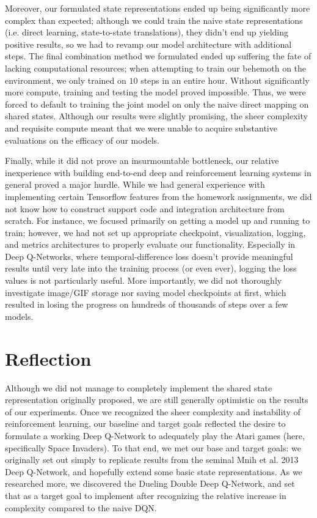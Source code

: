 \documentclass{article} %
\begin{document}
Moreover, our formulated state representations ended up being significantly more complex than
expected; although we could train the naive state representations (i.e. direct learning,
state-to-state translations), they didn't end up yielding positive results, so we had to revamp our
model architecture with additional steps. The final combination method we formulated ended up
suffering the fate of lacking computational resources; when attempting to train our behemoth on the
environment, we only trained on $10$ steps in an entire hour. Without significantly more compute,
training and testing the model proved impossible. Thus, we were forced to default to training the
joint model on only the naive direct mapping on shared states. Although our results were slightly
promising, the sheer complexity and requisite compute meant that we were unable to acquire
substantive evaluations on the efficacy of our models.

Finally, while it did not prove an insurmountable bottleneck, our relative inexperience with
building end-to-end deep and reinforcement learning systems in general proved a major hurdle. While
we had general experience with implementing certain Tensorflow features from the homework
assignments, we did not know how to construct support code and integration architecture from
scratch. For instance, we focused primarily on getting a model up and running to train; however, we
had not set up appropriate checkpoint, visualization, logging, and metrics architectures to properly
evaluate our functionality. Especially in Deep Q-Networks, where temporal-difference loss doesn't
provide meaningful results until very late into the training process (or even ever), logging the
loss values is not particularly useful. More importantly, we did not thoroughly investigate
image/GIF storage nor saving model checkpoints at first, which resulted in losing the progress on
hundreds of thousands of steps over a few models.


\section{Reflection}

Although we did not manage to completely implement the shared state representation originally
proposed, we are still generally optimistic on the results of our experiments. Once we recognized
the sheer complexity and instability of reinforcement learning, our baseline and target goals
reflected the desire to formulate a working Deep Q-Network to adequately play the Atari games (here,
specifically Space Invaders). To that end, we met our base and target goals: we originally set out
simply to replicate results from the seminal Mnih et al. 2013 Deep Q-Network, and hopefully extend
some basic state representations. As we researched more, we discovered the Dueling Double Deep
Q-Network, and set that as a target goal to implement after recognizing the relative increase in
complexity compared to the naive DQN.
\end{document}
